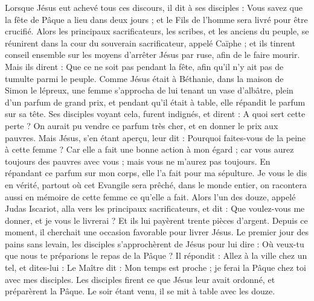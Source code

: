 \begin{multicols}{2}
\VerseOne{}Lorsque Jésus eut achevé tous ces discours, il dit à ses disciples :
Vous savez que la fête de Pâque a lieu dans deux jours ; et le Fils de l'homme sera livré pour être crucifié.
Alors les principaux sacrificateurs, les scribes, et les anciens du peuple, se réunirent dans la cour du souverain sacrificateur, appelé Caïphe ;
et ils tinrent conseil ensemble sur les moyens d’arrêter Jésus par ruse, afin de le faire mourir.
Mais ils dirent : Que ce ne soit pas pendant la fête, afin qu’il n’y ait pas de tumulte parmi le peuple.
Comme Jésus était à Béthanie, dans la maison de Simon le lépreux,
une femme s’approcha de lui tenant un vase d'albâtre, plein d'un parfum de grand prix, et pendant qu’il était à table, elle répandit le parfum sur sa tête.
Ses disciples voyant cela, furent indignés, et dirent : A quoi sert cette perte ?
On aurait pu vendre ce parfum très cher, et en donner le prix aux pauvres.
Mais Jésus, s’en étant aperçu, leur dit : Pourquoi faites-vous de la peine à cette femme ? Car elle a fait une bonne action à mon égard ;
car vous aurez toujours des pauvres avec vous ; mais vous ne m'aurez pas toujours.
En répandant ce parfum sur mon corps, elle l'a fait pour ma sépulture.
Je vous le dis en vérité, partout où cet Evangile sera prêché, dans le monde entier, on racontera aussi en mémoire de cette femme ce qu’elle a fait.
Alors l'un des douze, appelé Judas Iscariot, alla vers les principaux sacrificateurs,
et dit : Que voulez-vous me donner, et je vous le livrerai ? Et ils lui payèrent trente pièces d'argent{}.
Depuis ce moment, il cherchait une occasion favorable pour livrer Jésus.
Le premier jour des pains sans levain, les disciples s’approchèrent de Jésus pour lui dire : Où veux-tu que nous te préparions le repas de la Pâque ?
Il répondit : Allez à la ville chez un tel, et dites-lui : Le Maître dit : Mon temps est proche ; je ferai la Pâque chez toi avec mes disciples.
Les disciples firent ce que Jésus leur avait ordonné, et préparèrent la Pâque.
Le soir étant venu, il se mit à table avec les douze.

\end{multicols}
